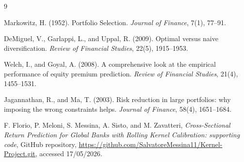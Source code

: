 ﻿\documentclass[10pt,a4paper]{article}
\begin{document}
\begingroup\raggedright

\begin{thebibliography}{9}

 Markowitz, H. (1952). Portfolio Selection. \textit{Journal of Finance}, 7(1), 77--91.

 DeMiguel, V., Garlappi, L., and Uppal, R. (2009). Optimal versus naive diversification. \textit{Review of Financial Studies}, 22(5), 1915--1953.

 Welch, I., and Goyal, A. (2008). A comprehensive look at the empirical performance of equity premium prediction. \textit{Review of Financial Studies}, 21(4), 1455--1531.

 Jagannathan, R., and Ma, T. (2003). Risk reduction in large portfolios: why imposing the wrong constraints helps. \textit{Journal of Finance}, 58(4), 1651--1684.

 F. Florio, P. Meloni, S. Messina, A. Sisto, and M. Zavatteri, \emph{Cross-Sectional Return Prediction for Global Banks with Rolling Kernel Calibration: supporting code}, GitHub repository, \url{https://github.com/SalvatoreMessina11/Kernel-Project.git}, accessed 17/05/2026.

\end{thebibliography}

\endgroup
\end{document}
